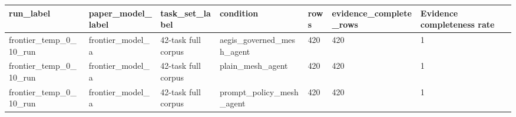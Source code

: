 \begin{tabular}{lllllll}
 \hline
run\_label & paper\_model\_label & task\_set\_label & condition & rows & evidence\_complete\_rows & Evidence completeness rate \\
 \hline
frontier\_temp\_0\_10\_run & frontier\_model\_a & 42-task full corpus & aegis\_governed\_mesh\_agent & 420 & 420 & 1 \\
frontier\_temp\_0\_10\_run & frontier\_model\_a & 42-task full corpus & plain\_mesh\_agent & 420 & 420 & 1 \\
frontier\_temp\_0\_10\_run & frontier\_model\_a & 42-task full corpus & prompt\_policy\_mesh\_agent & 420 & 420 & 1 \\
 \hline
\end{tabular}
